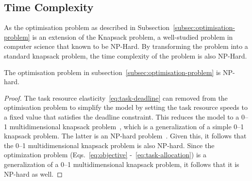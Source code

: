 \subsection{Time Complexity}
\label{subsec:time-complexity}
As the optimisation problem as described in Subsection~\ref{subsec:optimisation-problem} is an extension of the
Knapsack problem, a well-studied problem in computer science that known to be NP-Hard. By transforming the problem into
a standard knapsack problem, the time complexity of the problem is also NP-Hard.
\begin{theorem}
    The optimisation problem in subsection~\ref{subsec:optimisation-problem} is NP-hard.
\end{theorem}
\begin{proof}
    The task resource elasticity~\ref{eq:task-deadline} can removed from the optimisation problem to simplify the model
    by setting the task resource speeds to a fixed value that satisfies the deadline constraint. This reduces the model
    to a 0--1 multidimensional knapsack problem~\cite{knapsackproblems_2004}, which is a generalization of a
    simple 0--1 knapsack problem. The latter is an NP-hard problem~\cite{knapsackproblems_2004}. Given this, it follows
    that the 0--1 multidimensional knapsack problem is also NP-hard. Since the optimization problem
    (Eqs.~\ref{eq:objective} -~\ref{eq:task-allocation}) is a generalization of a 0--1 multidimensional knapsack
    problem, it follows that it is NP-hard as well.
\end{proof}


